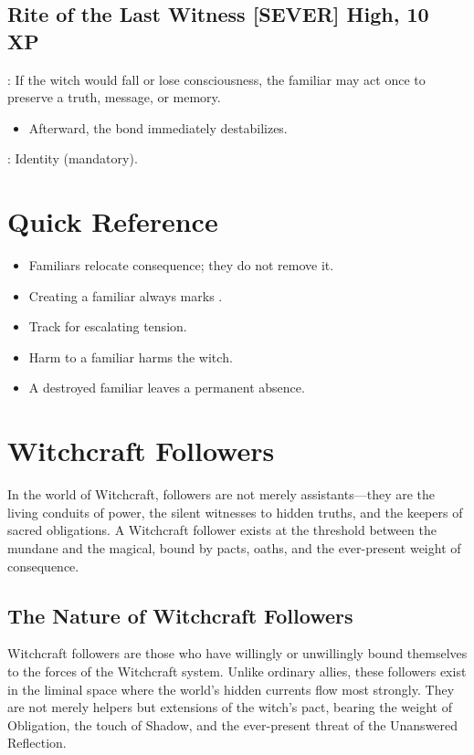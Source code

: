 \subsection{Rite of the Last Witness \hfill \textnormal{[SEVER] High, 10 XP}}
\begin{RiteBox}
: If the witch would fall or lose consciousness, the familiar may act once to preserve a truth, message, or memory.
\begin{itemize}
  \item Afterward, the bond immediately destabilizes.
\end{itemize}
: Identity (mandatory).
\end{RiteBox}

\section{Quick Reference}
\begin{RuleBox}
\begin{itemize}
  \item Familiars relocate consequence; they do not remove it.
  \item Creating a familiar always marks .
  \item Track  for escalating tension.
  \item Harm to a familiar harms the witch.
  \item A destroyed familiar leaves a permanent absence.
\end{itemize}
\end{RuleBox}

\section{Witchcraft Followers}

In the world of Witchcraft, followers are not merely assistants---they are the living conduits of power, the silent witnesses to hidden truths, and the keepers of sacred obligations. A Witchcraft follower exists at the threshold between the mundane and the magical, bound by pacts, oaths, and the ever-present weight of consequence.

\subsection{The Nature of Witchcraft Followers}

Witchcraft followers are those who have willingly or unwillingly bound themselves to the forces of the Witchcraft system. Unlike ordinary allies, these followers exist in the liminal space where the world's hidden currents flow most strongly. They are not merely helpers but extensions of the witch's pact, bearing the weight of Obligation, the touch of Shadow, and the ever-present threat of the Unanswered Reflection.


